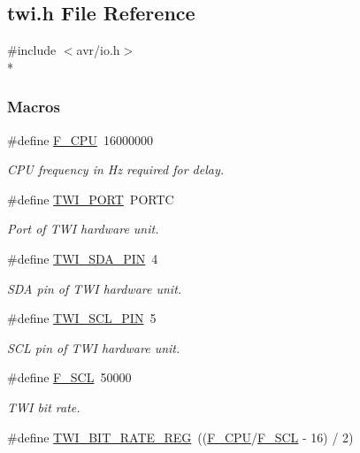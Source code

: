 \hypertarget{a00004}{}\subsection{twi.\+h File Reference}
\label{a00004}
{\ttfamily \#include $<$avr/io.\+h$>$}\\*
\subsubsection*{Macros}
\begin{DoxyCompactItemize}
\item 
\#define \hyperlink{a00007_ga43bafb28b29491ec7f871319b5a3b2f8}{F\+\_\+\+C\+PU}~16000000
\begin{DoxyCompactList}\small\item\em C\+PU frequency in Hz required for delay. \end{DoxyCompactList}\item 
\#define \hyperlink{a00007_ga762c164f4acd04d3ce3627fe73e7c018}{T\+W\+I\+\_\+\+P\+O\+RT}~P\+O\+R\+TC
\begin{DoxyCompactList}\small\item\em Port of T\+WI hardware unit. \end{DoxyCompactList}\item 
\#define \hyperlink{a00007_ga3f14ed8491293d0dda1372cceaa39851}{T\+W\+I\+\_\+\+S\+D\+A\+\_\+\+P\+IN}~4
\begin{DoxyCompactList}\small\item\em S\+DA pin of T\+WI hardware unit. \end{DoxyCompactList}\item 
\#define \hyperlink{a00007_gac0ad8b33f1be48e211f1eeae2dd65cee}{T\+W\+I\+\_\+\+S\+C\+L\+\_\+\+P\+IN}~5
\begin{DoxyCompactList}\small\item\em S\+CL pin of T\+WI hardware unit. \end{DoxyCompactList}\item 
\#define \hyperlink{a00007_ga7a1c522bed64982971384489ee477bd3}{F\+\_\+\+S\+CL}~50000
\begin{DoxyCompactList}\small\item\em T\+WI bit rate. \end{DoxyCompactList}\item 
\#define \hyperlink{a00007_ga801c158406ca2334b446e442a2debe37}{T\+W\+I\+\_\+\+B\+I\+T\+\_\+\+R\+A\+T\+E\+\_\+\+R\+EG}~((\hyperlink{a00007_ga43bafb28b29491ec7f871319b5a3b2f8}{F\+\_\+\+C\+PU}/\hyperlink{a00007_ga7a1c522bed64982971384489ee477bd3}{F\+\_\+\+S\+CL} -\/ 16) / 2)

\end{DoxyCompactItemize}
